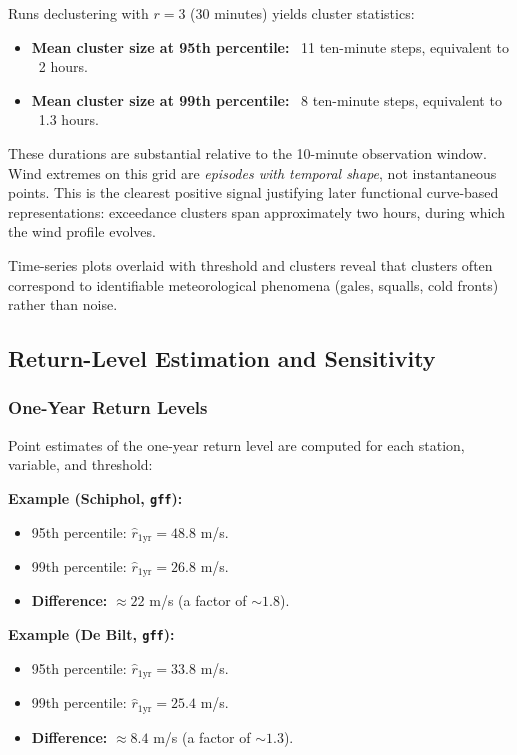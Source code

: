Runs declustering with $r = 3$ (30 minutes) yields cluster statistics:
\begin{itemize}
    \item \textbf{Mean cluster size at 95th percentile:} ~11 ten-minute steps, equivalent to ~2 hours.
    \item \textbf{Mean cluster size at 99th percentile:} ~8 ten-minute steps, equivalent to ~1.3 hours.
\end{itemize}

These durations are substantial relative to the 10-minute observation window. Wind extremes on this grid are \emph{episodes with temporal shape}, not instantaneous points. This is the clearest positive signal justifying later functional curve-based representations: exceedance clusters span approximately two hours, during which the wind profile evolves.

Time-series plots overlaid with threshold and clusters reveal that clusters often correspond to identifiable meteorological phenomena (gales, squalls, cold fronts) rather than noise.

\subsection{Return-Level Estimation and Sensitivity}

\subsubsection{One-Year Return Levels}

Point estimates of the one-year return level are computed for each station, variable, and threshold:

\textbf{Example (Schiphol, \texttt{gff}):}
\begin{itemize}
    \item 95th percentile: $\hat{r}_{1\text{yr}} = 48.8$ m/s.
    \item 99th percentile: $\hat{r}_{1\text{yr}} = 26.8$ m/s.
    \item \textbf{Difference:} $\approx 22$ m/s (a factor of $\sim 1.8$).
\end{itemize}

\textbf{Example (De Bilt, \texttt{gff}):}
\begin{itemize}
    \item 95th percentile: $\hat{r}_{1\text{yr}} = 33.8$ m/s.
    \item 99th percentile: $\hat{r}_{1\text{yr}} = 25.4$ m/s.
    \item \textbf{Difference:} $\approx 8.4$ m/s (a factor of $\sim 1.3$).
\end{itemize}

